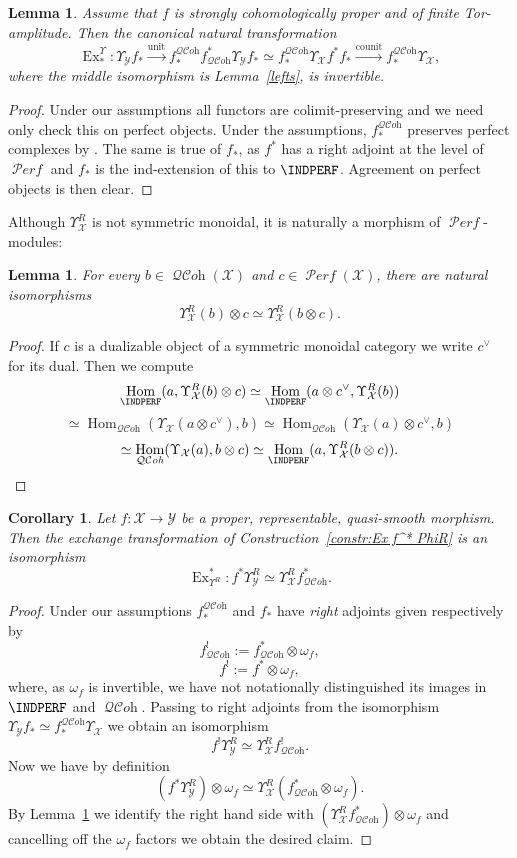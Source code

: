 \documentclass[12pt, oneside]{amsart}
\numberwithin{equation}{section}
\newtheorem{corollary}[subsubsection]{Corollary}
\newtheorem{lemma}[subsubsection]{Lemma}
\theoremstyle{remark}
\theoremstyle{plain}
\DeclareMathOperator{\QCOH}{\mathcal{QC}\textit{oh}}
\DeclareMathOperator{\PERF}{\mathcal{P}\textit{erf}}
\DeclareMathOperator{\Hom}{Hom}
\newcommand{\YY}{\mathcal{Y}}
\newcommand{\XX}{\mathcal{X}}
\newcommand{\Ren}{\Upsilon}
\begin{document}
\begin{lemma}\label{lem:pushindperf} Assume that $f$ is strongly cohomologically proper and of finite Tor-amplitude. Then the canonical natural transformation
\[
  \operatorname{Ex}_*^{\Ren} : \Ren_\YY f_*
  \xrightarrow{\mathrm{unit}} f^{\QCOH}_* f^*_{\QCOH} \Ren_\YY f_*
  \simeq f^{\QCOH}_* \Ren_\XX f^* f_*
  \xrightarrow{\mathrm{counit}} f^{\QCOH}_* \Ren_\XX,
\]
where the middle isomorphism is Lemma~\ref{lefts}, is invertible.
\end{lemma}\begin{proof} Under our assumptions all functors are colimit-preserving and we need only check this on perfect objects. Under the assumptions, $f^{\QCOH}_*$ preserves perfect complexes by \cite[Prop.~1.31]{KhanKstack}. The same is true of $f_*$, as $f^*$ has a right adjoint at the level of $\PERF$ and $f_*$ is the ind-extension of this to $\INDPERF$. Agreement on perfect objects is then clear.\end{proof}

Although $\Ren_\XX^R$ is not symmetric monoidal, it is naturally a morphism of $\PERF$-modules:

\begin{lemma}\label{perftens} For every $b \in \QCOH(\XX)$ and $c\in\PERF(\XX)$, there are natural isomorphisms $$\Ren_\XX^{R}(b)\otimes c\simeq \Ren_\XX^R(b\otimes c).$$  \end{lemma}

\begin{proof} If $c$ is a dualizable object of a symmetric monoidal category we write $c^\vee$ for its dual. Then we compute $$\Hom_{\INDPERF}(a,\Ren_\XX^R(b)\otimes c)\simeq\Hom_{\INDPERF}(a\otimes c^\vee,\Ren_{\XX}^R(b))$$ $$\simeq \Hom_{\QCOH}(\Ren_\XX(a\otimes c^\vee),b)\simeq\Hom_{\QCOH}(\Ren_\XX(a)\otimes c^\vee,b)$$ $$\simeq\Hom_{\QCOH}(\Ren_{\XX}(a),b\otimes c)\simeq\Hom_{\INDPERF}(a,\Ren_\XX^R(b\otimes c)).\qedhere$$\end{proof}

\begin{corollary}\label{cor:proper pullback PhiR}
Let $f : \XX \to \YY$ be a proper, representable, quasi-smooth morphism.
Then the exchange transformation of Construction~\ref{constr:Ex f^* PhiR} is an isomorphism
$$\operatorname{Ex}^*_{\Ren^R} : f^*\Ren_\YY^R\simeq \Ren_\XX^R f^*_{\QCOH}.$$
\end{corollary}

\begin{proof} Under our assumptions $f^{\QCOH}_*$ and $f_*$ have \emph{right} adjoints given respectively by $$f_{\QCOH}^!:=f_{\QCOH}^*\otimes\omega_f,$$ $$f^!:=f^*\otimes\omega_f,$$ where, as $\omega_f$ is invertible, we have not notationally distinguished its images in $\INDPERF$ and $\QCOH$. Passing to right adjoints from the isomorphism $\Ren_\YY f_*\simeq f^{\QCOH}_*\Ren_{\XX}$ we obtain an isomorphism $$f^!\Ren_\YY^R\simeq \Ren_\XX^R f_{\QCOH}^!.$$ Now we have by definition $$(f^*\Ren^R_\YY)\otimes\omega_f\simeq\Ren_\XX^R(f_{\QCOH}^*\otimes\omega_f).$$ By Lemma~\ref{perftens} we identify the right hand side with $(\Ren^R_{\XX} f_{\QCOH}^*)\otimes\omega_f$ and cancelling off the $\omega_f$ factors we obtain the desired claim.  \end{proof}
\end{document}
